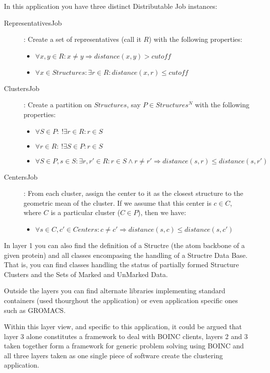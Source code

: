 \documentclass[a4paper]{article}
\begin{document}
In this application you have three distinct Distributable Job instances:
\begin{description}
 \item [RepresentativesJob] : Create a set of representatives (call it $R$) with the following properties:
\begin{itemize}
 \item $\forall x,y \in R : x \neq y \Rightarrow distance(x,y) > cutoff $
 \item $\forall x \in Structures : \exists r \in R : distance(x,r) \leq cutoff $
\end{itemize}
 \item [ClustersJob] : Create a partition on $Structures$, say $P \in Structures^{N}$ with the following properties:
\begin{itemize}
 \item $\forall S \in P : \ !\exists r \in R : r \in S$
 \item $\forall r \in R : \ !\exists S \in P : r \in S$
 \item $\forall S \in P, s \in S : \exists r,r' \in R : r \in S \land r \neq r' \Rightarrow distance(s,r) \leq distance(s,r') $
\end{itemize}
 \item [CentersJob] : From each cluster, assign the center to it as the closest structure to the geometric mean of the cluster. If we assume that this center is $c \in C$, where $C$ is a particular cluster ($C \in P$), then we have:
 \begin{itemize}
 \item $\forall s \in C , c' \in Centers : c \neq c' \Rightarrow distance(s,c) \leq distance(s,c')$
\end{itemize}

\end{description}

In layer 1 you can also find the definition of a Structre (the atom backbone of a given protein) and all classes encompasing the handling of a Structre Data Base. That is, you can find classes handling the status of partially formed Structure Clusters and the Sets of Marked and UnMarked Data.

Outside the layers you can find alternate libraries implementing standard containers (used thourghout the application) or even application specific ones such as GROMACS.

Within this layer view, and specific to this application, it could be argued that layer 3 alone constitutes a framework to deal with BOINC clients, layers 2 and 3 taken together form a framework for generic problem solving using BOINC and all three layers taken as one single piece of software create the clustering application.
\end{document}
